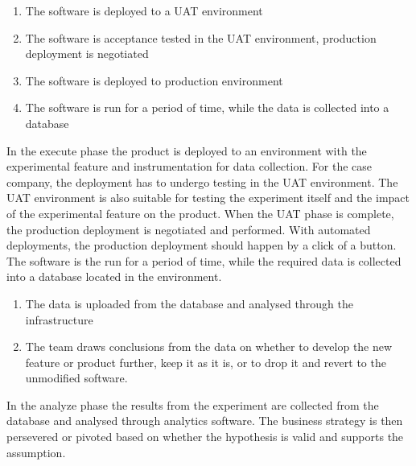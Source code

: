 \documentclass[english]{tktltiki2}
\theoremstyle{definition}
\theoremstyle{remark}
\begin{document}
\begin{enumerate}

  \item The software is deployed to a UAT environment %
  \item The software is acceptance tested in the UAT environment, production deployment is negotiated
  \item The software is deployed to production environment
  \item The software is run for a period of time, while the data is collected into a database
  
\end{enumerate}

In the execute phase the product is deployed to an environment with the experimental feature and instrumentation for data collection. For the case company, the deployment has to undergo testing in the UAT environment. The UAT environment is also suitable for testing the experiment itself and the impact of the experimental feature on the product. When the UAT phase is complete, the production deployment is negotiated and performed. With automated deployments, the production deployment should happen by a click of a button. The software is the run for a period of time, while the required data is collected into a database located in the environment.

\begin{enumerate}
\item The data is uploaded from the database and analysed through the infrastructure
\item The team draws conclusions from the data on whether to develop the new feature or product further, keep it as it is, or to drop it and revert to the unmodified software. 
\end{enumerate}

In the analyze phase the results from the experiment are collected from the database and analysed through analytics software. The business strategy is then persevered or pivoted based on whether the hypothesis is valid and supports the assumption.
\end{document}
